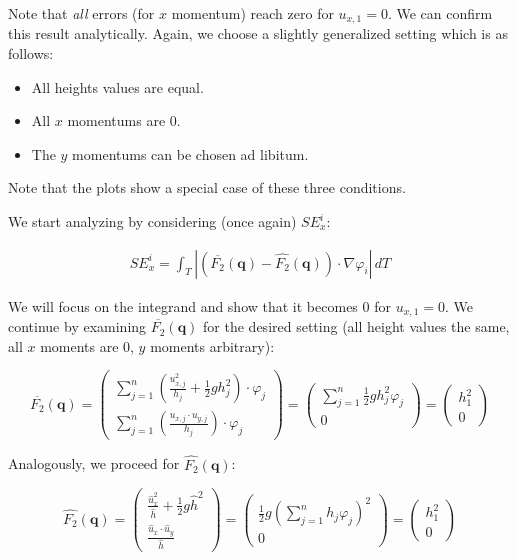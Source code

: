 \documentclass{article}
\renewcommand{\phi}{\varphi}
\begin{document}
Note that \emph{all} errors (for $x$ momentum) reach zero for $u_{x,1} = 0$. We can confirm this result analytically. Again, we choose a slightly generalized setting which is as follows:

\begin{itemize}
\item All heights values are equal.
\item All $x$ momentums are 0.
\item The $y$ momentums can be chosen ad libitum.
\end{itemize}

Note that the plots show a special case of these three conditions.

We start analyzing by considering (once again) $SE_x^i$:

\begin{align*}
  SE_x^i = \int_T \left| \left(\overline{F_2}(\mathbf{q}) - \widehat{F_2}(\mathbf{q})\right) \cdot \nabla \phi_i \right|\, dT
\end{align*}

We will focus on the integrand and show that it becomes 0 for $u_{x,1}=0$. We continue by examining $\overline{F_2}(\mathbf{q})$ for the desired setting (all height values the same, all $x$ moments are 0, $y$ moments arbitrary):

\begin{equation}
  \label{eq:1}
  \overline{F_2}(\mathbf{q}) =
  \begin{pmatrix}
    \sum_{j=1}^n \left( \frac{u_{x,j}^2}{h_j} + \frac{1}{2} g h_j^2 \right) \cdot \phi_j \\
    \sum_{j=1}^n \left( \frac{u_{x,j}\cdot u_{y,j}}{h_j} \right) \cdot \phi_j
  \end{pmatrix} =
  \begin{pmatrix}
    \sum_{j=1}^n \frac{1}{2} g h_j^2 \phi_j \\
    0
  \end{pmatrix} =
  \begin{pmatrix}
    h_1^2 \\ 0
  \end{pmatrix}
\end{equation}

Analogously, we proceed for $\widehat{F_2}(\mathbf{q})$:

\begin{equation}
  \label{eq:2}
  \widehat{F_2}(\mathbf{q}) =
  \begin{pmatrix}
    \frac{\widehat{u}_x^2}{\widehat h} + \frac{1}{2} g \widehat h ^2 \\
    \frac{\widehat u_x \cdot \widehat u_y}{\widehat h}
  \end{pmatrix} =
  \begin{pmatrix}
    \frac{1}{2} g \left( \sum_{j=1}^n h_j \phi_j \right) ^2 \\
    0
  \end{pmatrix} =
  \begin{pmatrix}
    h_1^2 \\ 0
  \end{pmatrix}
\end{equation}
\end{document}
